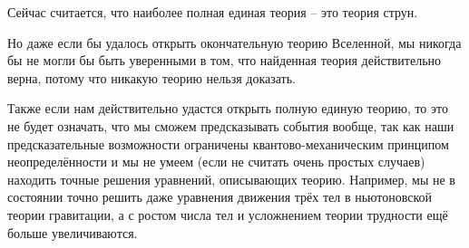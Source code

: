 \documentclass[exam_answers.tex]{subfiles}
\begin{document}
Сейчас считается, что наиболее полная единая теория -- это теория струн.

Но даже если бы удалось открыть окончательную теорию Вселенной, мы никогда бы не могли бы быть уверенными в том, что найденная теория действительно верна, потому что никакую теорию нельзя доказать.

Также если нам действительно удастся открыть полную единую теорию, то это не будет означать, что мы сможем предсказывать события вообще, так как наши предсказательные возможности ограничены квантово-механическим принципом неопределённости и мы не умеем (если не считать очень простых случаев) находить точные решения уравнений, описывающих теорию.
Например, мы не в состоянии точно решить даже уравнения движения трёх тел в ньютоновской теории гравитации, а с ростом числа тел и усложнением теории трудности ещё больше увеличиваются.
\end{document}

